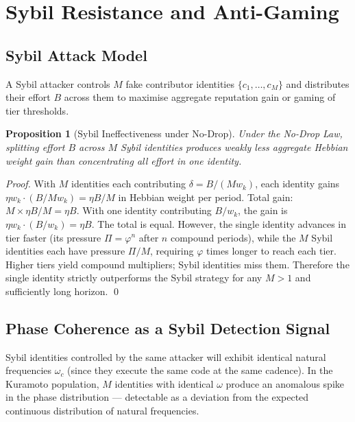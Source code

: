 \documentclass[12pt]{article}
\newtheorem{proposition}[theorem]{Proposition}
\newcommand{\PHI}{\varphi}
\begin{document}
\section{Sybil Resistance and Anti-Gaming}
\label{sec:sybil}

\subsection{Sybil Attack Model}

A Sybil attacker controls $M$ fake contributor identities $\{c_1, \ldots, c_M\}$
and distributes their effort $B$ across them to maximise aggregate reputation
gain or gaming of tier thresholds.

\begin{proposition}[Sybil Ineffectiveness under No-Drop]
  Under the No-Drop Law, splitting effort $B$ across $M$ Sybil identities
  produces weakly less aggregate Hebbian weight gain than concentrating all
  effort in one identity.
\end{proposition}

\begin{proof}
  With $M$ identities each contributing $\delta = B / (M w_k)$, each identity
  gains $\eta w_k \cdot (B / M w_k) = \eta B / M$ in Hebbian weight per period.
  Total gain: $M \times \eta B / M = \eta B$.  With one identity contributing
  $B / w_k$, the gain is $\eta w_k \cdot (B / w_k) = \eta B$.  The total is
  equal.  However, the single identity advances in tier faster (its pressure
  $\Pi = \PHI^n$ after $n$ compound periods), while the $M$ Sybil identities
  each have pressure $\Pi/M$, requiring $\PHI$ times longer to reach each tier.
  Higher tiers yield compound multipliers; Sybil identities miss them.
  Therefore the single identity strictly outperforms the Sybil strategy for
  any $M > 1$ and sufficiently long horizon. \qed
\end{proof}

\subsection{Phase Coherence as a Sybil Detection Signal}

Sybil identities controlled by the same attacker will exhibit identical natural
frequencies $\omega_c$ (since they execute the same code at the same cadence).
In the Kuramoto population, $M$ identities with identical $\omega$ produce an
anomalous spike in the phase distribution — detectable as a deviation from the
expected continuous distribution of natural frequencies.
\end{document}
